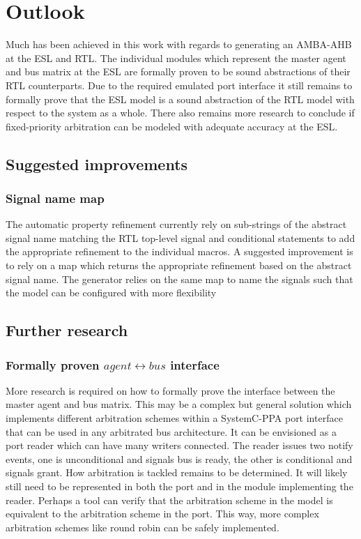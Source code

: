 \section{Outlook}
\label{sec:outl}
Much has been achieved in this work with regards to generating an AMBA-AHB at the ESL and RTL. The individual modules which represent the master agent and bus matrix at the ESL are formally proven to be sound abstractions of their RTL counterparts. Due to the required emulated port interface it still remains to formally prove that the ESL model is a sound abstraction of the RTL model with respect to the system as a whole. There also remains more research to conclude if fixed-priority arbitration can be modeled with adequate accuracy at the ESL.   

\subsection{Suggested improvements}
\label{sec:impr}
\subsubsection{Signal name map}
The automatic property refinement currently rely on sub-strings of the abstract signal name matching the RTL top-level signal and conditional statements to add the appropriate refinement to the individual macros. A suggested improvement is to rely on a map which returns the appropriate refinement based on the abstract signal name. The generator relies on the same map to name the signals such that the model can be configured with more flexibility


\subsection{Further research}
\subsubsection{Formally proven $agent\leftrightarrow bus$ interface}
More research is required on how to formally prove the interface between the master agent and bus matrix. This may be a complex but general solution which implements different arbitration schemes within a SystemC-PPA port interface that can be used in any arbitrated bus architecture. It can be envisioned as a port reader which can have many writers connected. The reader issues two notify events, one is unconditional and signals bus is ready, the other is conditional and signals grant. How arbitration is tackled remains to be determined. It will likely still need to be represented in both the port and in the module implementing the reader. Perhaps a tool can verify that the arbitration scheme in the model is equivalent to the arbitration scheme in the port. This way, more complex arbitration schemes like round robin can be safely implemented.  

